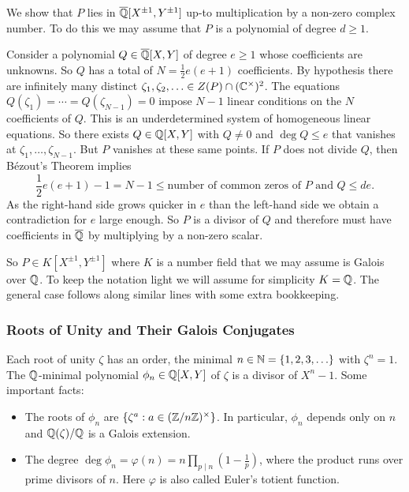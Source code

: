 We show that $P$ lies in ${\overline{\mathbb{Q}}}[X^{\pm 1},Y^{\pm 1}]$ up-to
multiplication by a non-zero complex number. To do this we may assume
that $P$ is a polynomial of degree $d\ge 1$.

Consider a polynomial $Q\in
{\overline{\mathbb{Q}}}[X,Y]$ of degree $e\ge 1$ whose coefficients are unknowns. So
$Q$ has a total of $N = \frac 12 e(e+1)$ coefficients. 
By hypothesis there are infinitely many distinct
$\zeta_1,\zeta_2,\ldots \in Z(P)\cap ({\mathbb{C}}^\times)^2$.
The equations $Q(\zeta_1) = \cdots = Q(\zeta_{N-1})=0$
impose $N-1$ linear conditions on the $N$ coefficients of
$Q$.
This is an underdetermined system of homogeneous linear equations. So
there exists $Q\in {\mathbb{Q}}[X,Y]$ with $Q\not=0$  and $\deg Q \le e$ that vanishes at
$\zeta_1,\ldots,\zeta_{N-1}$. But $P$ vanishes at these same points.
If $P$ does not divide $Q$, then B\'ezout's Theorem implies
\begin{equation*}
  \frac 12 e(e+1)-1=  N-1 \le \text{number of common zeros of $P$ and $Q$} \le de.
\end{equation*}
As the right-hand side grows quicker in $e$ than the left-hand side we obtain a
contradiction for $e$ large enough. So $P$ is a divisor of $Q$ and
therefore must have coefficients in ${\overline{\mathbb{Q}}}$ by multiplying by a non-zero
scalar. 

So $P \in K[X^{\pm 1},Y^{\pm 1}]$ where $K$ is a number field that we may assume is
Galois over ${\mathbb{Q}}$. To keep the notation light we will assume for
simplicity $K={\mathbb{Q}}$. The general case follows along similar lines with
some extra bookkeeping.

\subsubsection{Roots of Unity and Their Galois Conjugates}
\label{sec:rootsof1}
Each root of unity $\zeta$ has an order, the minimal
$n\in{\mathbb{N}}=\{1,2,3,\ldots\}$
with
$\zeta^n=1$. The ${\mathbb{Q}}$-minimal polynomial $\phi_n\in{\mathbb{Q}}[X,Y]$
of $\zeta$ is a divisor of
$X^n-1$. Some important facts:

\begin{itemize}
\item The roots of $\phi_n$ are $\{\zeta^a : a\in
  ({\mathbb{Z}}/n{\mathbb{Z}})^\times\}$. In particular, $\phi_n$ depends only on $n$
  and ${\mathbb{Q}}(\zeta)/{\mathbb{Q}}$ is a Galois extension. 
\item The degree $\deg \phi_n = \varphi(n)= n \prod_{p\mid n}
  \left(1-\frac 1p\right)$, where the product runs over prime divisors
  of $n$. Here $\varphi$ is also called Euler's totient function.
\end{itemize}


